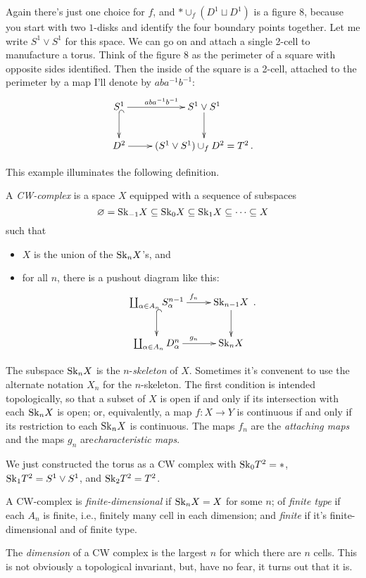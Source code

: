 Again there's just one choice for $f$, and 
$\ast\cup_f(D^1\sqcup D^1)$ is a figure $8$, because you start with 
two $1$-disks and identify the four boundary points together. Let me write 
$S^1\vee S^1$ for this space. We can go on and attach a single 2-cell to 
manufacture a torus. Think of the figure 8 as the perimeter of a square with opposite sides identified. Then the inside of the square is a 2-cell, attached to the perimeter by a map I'll denote by $aba^{-1}b^{-1}$: 
\begin{equation*}
\xymatrix{S^1\ar[r]^{aba^{-1}b^{-1}}\ar@{^(->}[d] & S^1\vee S^1\ar[d]\\
D^2\ar[r] & (S^1\vee S^1)\cup_f D^2=T^2\,.
}\end{equation*}

This example illuminates the following definition.

\begin{definition}
A \emph{CW-complex} is a space $X$ equipped with a sequence of subspaces 
\[
\varnothing=\mathrm{Sk}_{-1}X\subseteq\mathrm{Sk}_0X\subseteq\mathrm{Sk}_1X\subseteq\cdots\subseteq X
\]
such that 
\begin{itemize}
\item $X$ is the union of the $\mathrm{Sk}_nX$'s, and 
\item for all $n$, there is a pushout diagram like this:
\begin{equation*}
\xymatrix{\coprod_{\alpha\in A_n}S^{n-1}_\alpha\ar[r]^{f_n}\ar@{^(->}[d] 
& \Sk_{n-1}X\ar[d]\\
\coprod_{\alpha\in A_n}D^n_\alpha\ar[r]^{g_n} & \Sk_nX}\,.
\end{equation*}
\end{itemize}
\end{definition}
The subspace $\mathrm{Sk}_nX$ is the $n$-{\em skeleton} of $X$. 
Sometimes it's convenent to use the alternate notation $X_n$ 
for the $n$-skeleton.
The first condition is intended topologically, so that a subset of $X$ is open if and only if its intersection with each $\mathrm{Sk}_nX$ is open; or, equivalently, a map $f:X\to Y$ is continuous if and only if its restriction to each $\mathrm{Sk}_nX$ is continuous. The maps $f_n$ are the {\em attaching maps} and the maps $g_n$ are{\em characteristic maps}. 

\begin{example}
We just constructed the torus as a CW complex with $\mathrm{Sk}_0T^2=\ast$,$\mathrm{Sk}_1T^2=S^1\vee S^1$, and $\mathrm{Sk}_2T^2=T^2$.
\end{example}
\begin{definition}
A CW-complex is \emph{finite-dimensional} if $\mathrm{Sk}_nX=X$ for some $n$;
of \emph{finite type} if each $A_n$ is finite, i.e., finitely many cell in each dimension; and \emph{finite} if it's finite-dimensional and of finite type.
\end{definition}
The {\em dimension} of a CW complex is the largest $n$ for which there are 
$n$ cells. This is not obviously a topological invariant, but, have no fear,
it turns out that it is.

